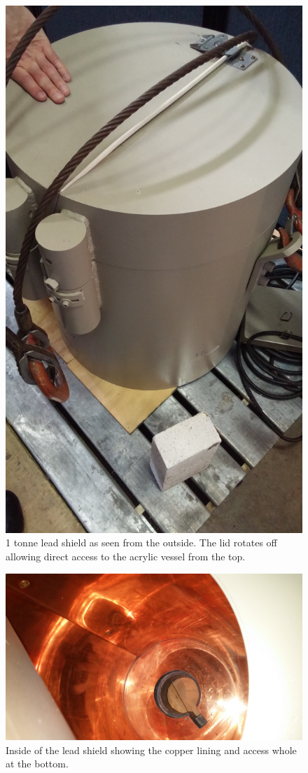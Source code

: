 \documentclass[]{article}
\begin{document}
\begin{figure}
  \includegraphics[width=\textwidth]{shield.jpg}
  \caption{1 tonne lead shield as seen from the outside. The lid rotates off allowing direct
  access to the acrylic vessel from the top.}
\end{figure}
\begin{figure}
  \includegraphics[width=\textwidth]{shield_inside.jpg}
  \caption{Inside of the lead shield showing the copper lining and access whole at the bottom.}
\end{figure}
\end{document}
